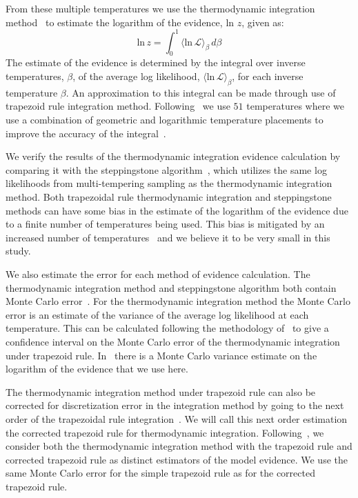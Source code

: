 From these multiple temperatures we use the thermodynamic integration method~\citep{lartillot2006computing,friel2008marginal} to estimate the logarithm of the evidence, ln $z$, given as:
\begin{equation}
\textrm{ln} \, z = \int_0^1 \langle \textrm{ln} \, \mathcal{L} \rangle_{\beta} \, d\beta
\label{eq:thermoint}
\end{equation}
The estimate of the evidence is determined by the integral over inverse temperatures, $\beta$, of the average log likelihood, $\langle \textrm{ln}\, \mathcal{L} \rangle_{\beta}$, for each inverse temperature $\beta$. An approximation to this integral can be made through use of trapezoid rule integration method. Following~\cite{de2018tidal} we use $51$ temperatures where we use a combination of geometric and logarithmic temperature placements to improve the accuracy of the integral~\citep{liu2016evaluating}.

We verify the results of the thermodynamic integration evidence calculation by comparing it with the steppingstone algorithm~\citep{xie2010improving}, which utilizes the same log likelihoods from multi-tempering sampling as the thermodynamic integration method. Both trapezoidal rule thermodynamic integration and steppingstone methods can have some bias in the estimate of the logarithm of the evidence due to a finite number of temperatures being used. This bias is mitigated by an increased number of temperatures~\citep{xie2010improving, Russel:2018pqv} and we believe it to be very small in this study.

We also estimate the error for each method of evidence calculation. The thermodynamic integration method and steppingstone algorithm both contain Monte Carlo error~\citep{annis2019thermodynamic}. For the thermodynamic integration method the Monte Carlo error is an estimate of the variance of the average log likelihood at each temperature. This can be calculated following the methodology of~\cite{annis2019thermodynamic} to give a confidence interval on the Monte Carlo error of the thermodynamic integration under trapezoid rule. In~\cite{xie2010improving} there is a Monte Carlo variance estimate on the logarithm of the evidence that we use here.

The thermodynamic integration method under trapezoid rule can also be corrected for discretization error in the integration method by going to the next order of the trapezoidal rule integration~\citep{friel2014improving}. We will call this next order estimation the corrected trapezoid rule for thermodynamic integration. Following~\cite{annis2019thermodynamic}, we consider both the thermodynamic integration method with the trapezoid rule and corrected trapezoid rule as distinct estimators of the model evidence. We use the same Monte Carlo error for the simple trapezoid rule as for the corrected trapezoid rule.

